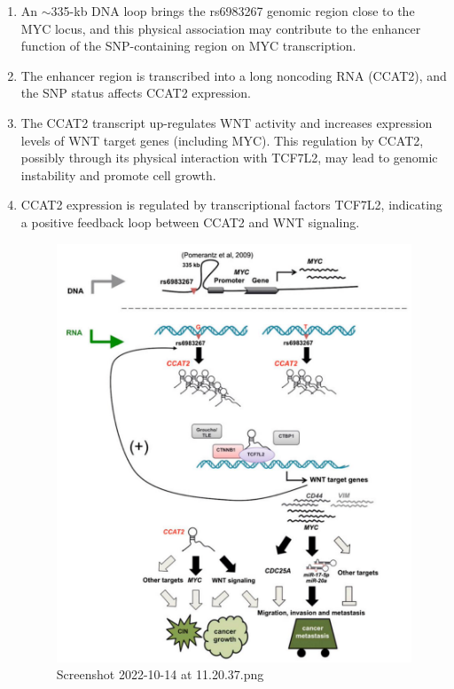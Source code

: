 \begin{enumerate}
\def\labelenumi{\arabic{enumi}.}
\item
  An $\sim$335-kb DNA loop brings the rs6983267 genomic region close to the MYC locus, and this physical association may contribute to the enhancer function of the SNP-containing region on MYC transcription.
\item
  The enhancer region is transcribed into a long noncoding RNA (CCAT2), and the SNP status affects CCAT2 expression.
\item
  The CCAT2 transcript up-regulates WNT activity and increases expression levels of WNT target genes (including MYC). This regulation by CCAT2, possibly through its physical interaction with TCF7L2, may lead to genomic instability and promote cell growth.
\item
  CCAT2 expression is regulated by transcriptional factors TCF7L2, indicating a positive feedback loop between CCAT2 and WNT signaling.

  \begin{figure}
  \centering
  \includegraphics[width=\textwidth]{../_resources/Screenshot_2022-10-14_at_11-20-37.png}
  \caption{Screenshot 2022-10-14 at 11.20.37.png}
  \end{figure}
\end{enumerate}

